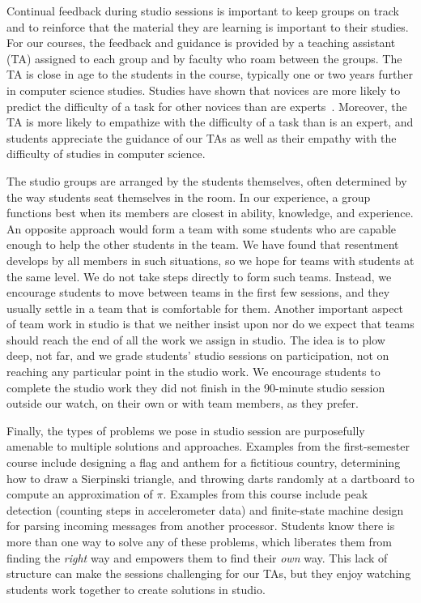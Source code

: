 Continual feedback during studio sessions is important to keep groups on
track and to reinforce that the material they are learning is important to
their studies.  For our courses, the feedback and guidance is provided by
a teaching assistant (TA) assigned to each group and by faculty who 
roam between the groups.  The TA is close in age to the students in the
course, typically one or two years further in computer science studies.
Studies have shown that novices are more likely to predict the difficulty
of a task for other novices than are experts~\cite{Hinds:1999}.  Moreover,
the TA is more likely to empathize with the difficulty of a task than is
an expert, and students appreciate the guidance of our TAs as well as their
empathy with the difficulty of studies in computer science.

The studio groups are arranged by the students themselves, often determined
by the way students seat themselves in the room. In our experience, a group
functions best when its members are closest in ability, knowledge, and
experience.  An opposite approach would form a team with some students who
are capable enough to help the other students in the team.  We have found
that resentment develops by all members in such situations, so we hope for
teams with students at the same level.   We do not take steps directly to
form such teams.  Instead, we encourage students to move between teams in
the first few sessions, and they usually settle in a team that is comfortable
for them.  Another important aspect of team work in studio is that we neither
insist upon nor do we expect that teams should reach the end of all the work
we assign in studio.  The idea is to plow deep, not far, and we grade
students' studio sessions on participation, 
not on reaching any particular point in the
studio work.  We encourage students to complete the studio work they did not
finish in the 90-minute studio session outside our watch, 
on their own or with team members,
as they prefer.

Finally, the types of problems we pose in studio session are purposefully
amenable to multiple solutions and approaches.  Examples from the
first-semester course include designing
a flag and anthem for a fictitious country, determining how to draw a Sierpinski
triangle, and throwing darts randomly at a dartboard to compute an approximation
of $\pi$.
Examples from this course include peak detection (counting steps in
accelerometer data) and finite-state machine design for parsing
incoming messages from another processor.
Students know there is more than one way to solve any of these
problems, which liberates them from finding the \emph{right} way and
empowers them to find their \emph{own} way.  This lack of structure can make
the sessions challenging for our TAs, but they enjoy watching students work
together to create solutions in studio.


